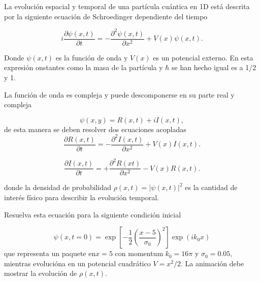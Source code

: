 \documentclass{article}
\begin{document}
\begin{enumerate}
La evoluci\'on espacial y temporal de una part\'icula cu\'antica en
1D est\'a descrita por la siguiente ecuaci\'on de Schroedinger dependiente del
tiempo 

\begin{equation}
i\frac{\partial \psi(x,t)}{\partial t} =
-\frac{\partial^2\psi(x,t)}{\partial x^2} + V(x)\psi(x,t).
\end{equation}

Donde $\psi(x,t)$ es la funci\'on de onda y $V(x)$ es un potencial
externo. En esta expresi\'on onstantes como la masa de la part\'icula
y $\hbar$ se han hecho igual es a 1/2 y 1. 

La funci\'on de onda es compleja y puede descomponerse en su parte
real y compleja   

\begin{equation}
\psi(x,y) = R(x,t) + iI(x,t), 
\end{equation}
%
de esta manera se deben resolver dos ecuaciones acopladas
\begin{equation}
\frac{\partial R(x,t)}{\partial t} =
-\frac{\partial^2I(x,t)}{\partial x^2} + V(x)I(x,t).
\end{equation}

\begin{equation}
\frac{\partial I(x,t)}{\partial t} =
+\frac{\partial^2R(xt)}{\partial x^2} - V(x)R(x,t).
\end{equation}

donde la densidad de probabilidad $\rho(x,t) = |\psi(x,t)|^2$
es la cantidad de inter\'es f\'isico para describir la evoluci\'on
temporal. 

Resuelva esta ecuaci\'on para la siguiente condici\'on inicial

\begin{equation}
\psi(x,t=0) = \exp\left[ -\frac{1}{2} \left(\frac{x-5}{\sigma_0}\right)^2\right]\exp{(ik_0x)}
\end{equation}
que representa un paquete en$x=5$ con momentum $k_0=16\pi$ y
$\sigma_0=0.05$, mientras evoluci\'ona en un potencial cuadr\'atico
$V=x^2/2$. La animaci\'on debe mostrar la evoluci\'on de $\rho(x,t)$.

\end{enumerate}
\end{document}
